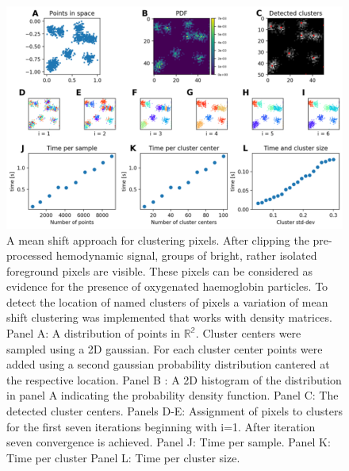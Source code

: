 \begin{figure}[!htb]
\centering
\includegraphics[width=\textwidth,height=\textheight,keepaspectratio]{Figures/clustering_approach_properties}
\decoRule
\caption[A mean shift approach for clustering pixels]{A mean shift approach for clustering pixels. After clipping the pre-processed hemodynamic signal, groups of bright, rather isolated foreground pixels are visible. These pixels can be considered as evidence for the presence of oxygenated haemoglobin particles. To detect the location of named clusters of pixels a variation of mean shift clustering was implemented that works with density matrices. Panel A: A distribution of points in $\mathbb{R^2}$. Cluster centers were sampled using a 2D gaussian. For each cluster center points were added using a second gaussian probability distribution cantered at the respective location. Panel B : A 2D histogram of the distribution in panel A indicating the probability density function. Panel C: The detected cluster centers. Panels D-E: Assignment of pixels to clusters for the first seven iterations beginning with i=1. After iteration seven convergence is achieved. Panel J: Time per sample. Panel K: Time per cluster Panel L: Time per cluster size. }
\label{fig:clustering_approach_properties}
\end{figure}
